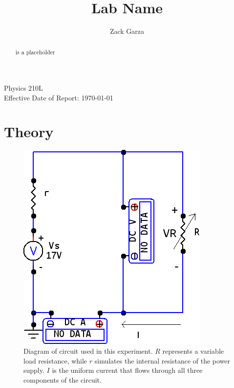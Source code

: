 \documentclass[twocolumn,english]{IEEEtran}
\theoremstyle{plain}
\theoremstyle{plain}
\begin{document}
\title{Lab Name}


\author{Zack Garza}


\IEEEspecialpapernotice
{Physics 210L \\
Effective Date of Report: \today}


\maketitle
\begin{abstract}
 is a placeholder
\end{abstract}
\tableofcontents

\section{Theory}
\begin{figure}[h!]
  \begin{centering}
  \begin{center}
  \includegraphics[width=\linewidth]{./circuit.png}
  \caption{Diagram of circuit used in this experiment. $R$ represents a variable load resistance, while $r$ simulates the internal resistance of the power supply. $I$ is the uniform current that flows through all three components of the circuit.}
  \label{fig:circuit_diagram}
  \end{center}
  \par\end{centering}
  \end{figure}
\end{document}
